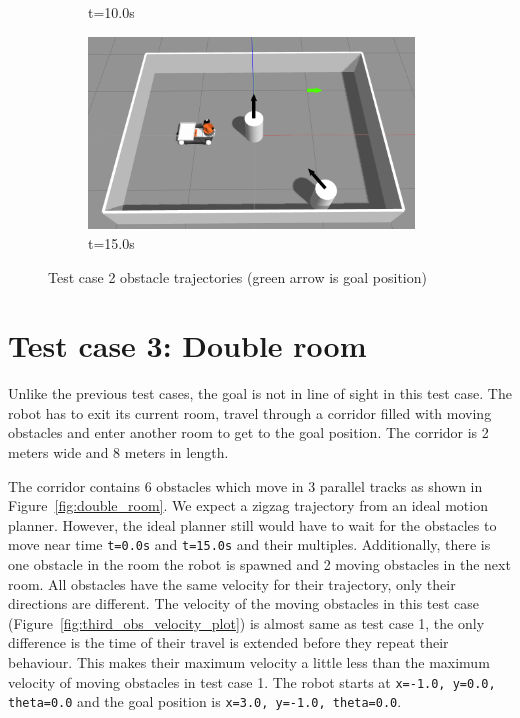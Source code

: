 \begin{figure}[H]
\begin{subfigure}[b]{0.50\linewidth}
        \caption{t=10.0s}
    \end{subfigure}%
    \begin{subfigure}[b]{0.50\linewidth}
        \centering
        \includegraphics[width=0.95\textwidth]{images/test_case_2/exp4.png}
        \caption{t=15.0s}
    \end{subfigure}%
    \caption{Test case 2 obstacle trajectories (green arrow is goal position)}\label{fig:two_obstacle_single_room}
\end{figure}

\section{Test case 3: Double room}%
\label{sec:test_case_3_double_room}
    Unlike the previous test cases, the goal is not in line of sight in this test case. The 
    robot has to exit its current room, travel through a corridor filled with moving obstacles 
    and enter another room to get to the goal position. The corridor is 2 meters wide and 8 meters
    in length. 

    The corridor contains 6 obstacles which move in 3 parallel tracks as shown in Figure~\ref{fig:double_room}.
    We expect a zigzag trajectory from an ideal motion planner. However, the ideal planner still 
    would have to wait for the obstacles to move near time \texttt{t=0.0s} and \texttt{t=15.0s} and 
    their multiples.
    Additionally, there is one obstacle in the room the robot is spawned and 2 moving obstacles in 
    the next room. All obstacles have the same velocity for their trajectory, only their directions
    are different. The velocity of the moving obstacles in this test case 
    (Figure~\ref{fig:third_obs_velocity_plot}) is almost same as test case 1,
    the only difference is the time of their travel is extended before they repeat their behaviour. 
    This makes their maximum velocity a little less than the maximum velocity of moving obstacles in 
    test case 1.
    The robot starts at \texttt{x=-1.0, y=0.0, theta=0.0} and the goal position is \texttt{x=3.0, y=-1.0, theta=0.0}.

